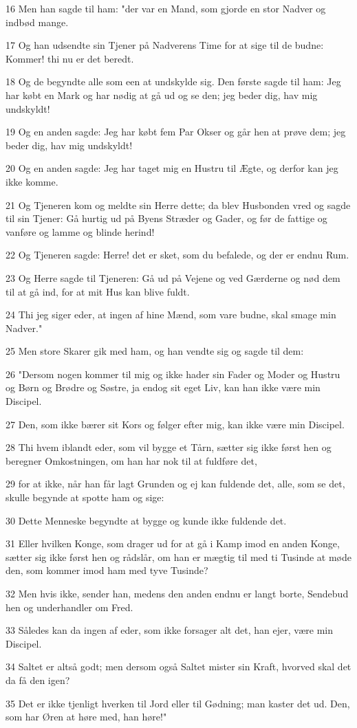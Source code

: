 \par 16 Men han sagde til ham: "der var en Mand, som gjorde en stor Nadver og indbød mange.
\par 17 Og han udsendte sin Tjener på Nadverens Time for at sige til de budne: Kommer! thi nu er det beredt.
\par 18 Og de begyndte alle som een at undskylde sig. Den første sagde til ham: Jeg har købt en Mark og har nødig at gå ud og se den; jeg beder dig, hav mig undskyldt!
\par 19 Og en anden sagde: Jeg har købt fem Par Okser og går hen at prøve dem; jeg beder dig, hav mig undskyldt!
\par 20 Og en anden sagde: Jeg har taget mig en Hustru til Ægte, og derfor kan jeg ikke komme.
\par 21 Og Tjeneren kom og meldte sin Herre dette; da blev Husbonden vred og sagde til sin Tjener: Gå hurtig ud på Byens Stræder og Gader, og før de fattige og vanføre og lamme og blinde herind!
\par 22 Og Tjeneren sagde: Herre! det er sket, som du befalede, og der er endnu Rum.
\par 23 Og Herre sagde til Tjeneren: Gå ud på Vejene og ved Gærderne og nød dem til at gå ind, for at mit Hus kan blive fuldt.
\par 24 Thi jeg siger eder, at ingen af hine Mænd, som vare budne, skal smage min Nadver."
\par 25 Men store Skarer gik med ham, og han vendte sig og sagde til dem:
\par 26 "Dersom nogen kommer til mig og ikke hader sin Fader og Moder og Hustru og Børn og Brødre og Søstre, ja endog sit eget Liv, kan han ikke være min Discipel.
\par 27 Den, som ikke bærer sit Kors og følger efter mig, kan ikke være min Discipel.
\par 28 Thi hvem iblandt eder, som vil bygge et Tårn, sætter sig ikke først hen og beregner Omkostningen, om han har nok til at fuldføre det,
\par 29 for at ikke, når han får lagt Grunden og ej kan fuldende det, alle, som se det, skulle begynde at spotte ham og sige:
\par 30 Dette Menneske begyndte at bygge og kunde ikke fuldende det.
\par 31 Eller hvilken Konge, som drager ud for at gå i Kamp imod en anden Konge, sætter sig ikke først hen og rådslår, om han er mægtig til med ti Tusinde at møde den, som kommer imod ham med tyve Tusinde?
\par 32 Men hvis ikke, sender han, medens den anden endnu er langt borte, Sendebud hen og underhandler om Fred.
\par 33 Således kan da ingen af eder, som ikke forsager alt det, han ejer, være min Discipel.
\par 34 Saltet er altså godt; men dersom også Saltet mister sin Kraft, hvorved skal det da få den igen?
\par 35 Det er ikke tjenligt hverken til Jord eller til Gødning; man kaster det ud. Den, som har Øren at høre med, han høre!"


